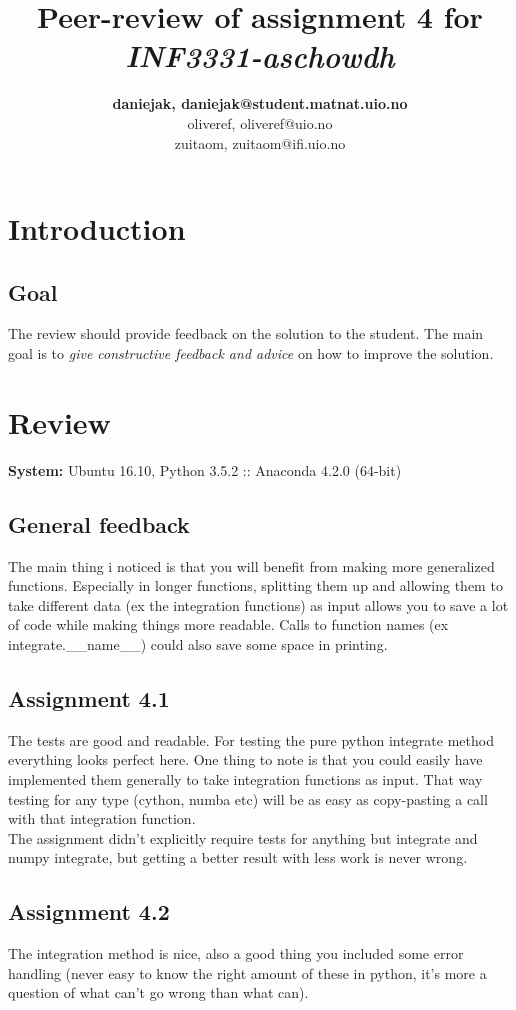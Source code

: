 \documentclass[a4paper]{article}
\title{Peer-review of assignment 4 for \textit{INF3331-aschowdh}}
\author{\textbf{daniejak, {daniejak@student.matnat.uio.no}} \\
 		oliveref, {oliveref@uio.no} \\
		zuitaom, {zuitaom@ifi.uio.no}}
\begin{document}
\maketitle

\section{Introduction}
\subsection{Goal}
The review should provide feedback on the solution to the student. The main goal is to \emph{give constructive feedback and advice} on how to improve the solution. 

\section{Review}\label{sec:review}

\textbf{System:} Ubuntu 16.10, Python 3.5.2 :: Anaconda 4.2.0 (64-bit)

\subsection*{General feedback}
The main thing i noticed is that you will benefit from making more generalized functions. Especially in longer functions, splitting them up and allowing them to take different data (ex the integration functions) as input allows you to save a lot of code while making things more readable. Calls to function names (ex integrate.\_\_name\_\_) could also save some space in printing.

\subsection*{Assignment 4.1}
The tests are good and readable. For testing the pure python integrate method everything looks perfect here. One thing to note is that you could easily have implemented them generally to take integration functions as input. That way testing for any type (cython, numba etc) will be as easy as copy-pasting a call with that integration function.\\[1\baselineskip] 
\noindent The assignment didn't explicitly require tests for anything but integrate and numpy integrate, but getting a better result with less work is never wrong.


\subsection*{Assignment 4.2} \label{sec:assignment5.2}
The integration method is nice, also a good thing you included some error handling (never easy to know the right amount of these in python, it's more a question of what can't go wrong than what can). 
\end{document}
